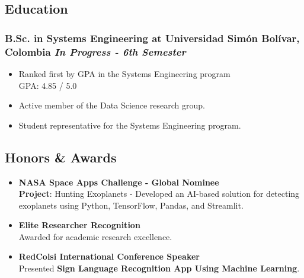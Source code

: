 \documentclass[a4paper,10pt]{article}
\begin{document}
\subsection*{Education}
\subsubsection*{\textbf{B.Sc. in Systems Engineering} at Universidad Simón Bolívar, Colombia \hfill \textit{In Progress - 6th Semester
}}
\begin{itemize}
  \item Ranked first by GPA in the Systems Engineering program \\
        GPA: 4.85 / 5.0
  \item Active member of the Data Science research group.

  \item Student representative for the Systems Engineering program.
\end{itemize}

\subsection*{Honors \& Awards}
\begin{itemize}
  \item \textbf{NASA Space Apps Challenge - Global Nominee} \\
        \textbf{Project}: Hunting Exoplanets - Developed an AI-based solution for detecting exoplanets using Python, TensorFlow, Pandas, and Streamlit.
  \item \textbf{Elite Researcher Recognition}\\
        Awarded for academic research excellence.
  \item \textbf{RedColsi International Conference Speaker}\\
        Presented \textbf{Sign Language Recognition App Using Machine Learning}.
        
\end{itemize}

\end{document}
